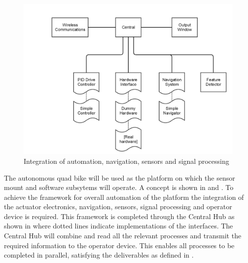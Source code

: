 \documentclass[main.tex]{subfiles}
\begin{document}
\begin{figure}[ht]
\includegraphics[width=\textwidth]{4-ConceptDesign/fyp_structure.png}
\centering
\caption{Integration of automation, navigation, sensors and signal processing} 
\end{figure}

The autonomous quad bike will be used as the platform on which the sensor mount and software subsytems will operate. A concept is shown in  and . To achieve the framework for overall automation of the platform the integration of the actuator electronics, navigation, sensors, signal processing and operator device is required. This framework is completed through the Central Hub as shown in  where dotted lines indicate implementations of the interfaces. The Central Hub will combine and read all the relevant processes and transmit the required information to the operator device. This enables all processes to be completed in parallel, satisfying the deliverables as defined in .
\end{document}
